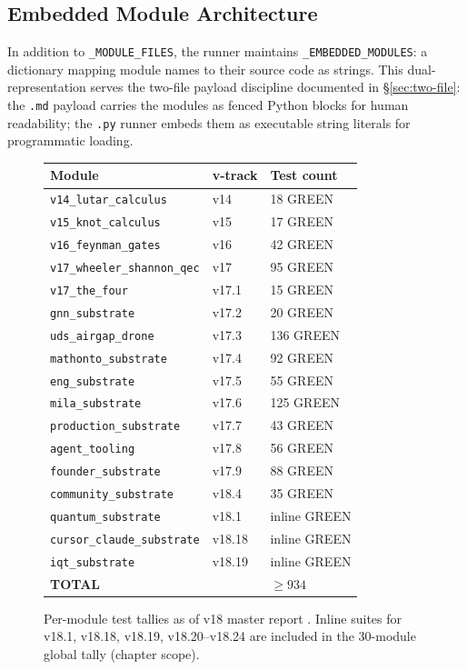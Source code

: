 \subsection{Embedded Module Architecture}
\label{ssec:embedded-arch}

In addition to \texttt{\_MODULE\_FILES}, the runner maintains
\texttt{\_EMBEDDED\_MODULES}: a dictionary mapping module names to their
source code as strings.  This dual-representation serves the two-file payload
discipline documented in \S\ref{sec:two-file}: the \texttt{.md} payload
carries the modules as fenced Python blocks for human readability; the
\texttt{.py} runner embeds them as executable string literals for programmatic
loading.

\begin{figure}[h]
  \centering
  \begin{tabular}{|l|l|l|}
    \hline
    \textbf{Module} & \textbf{v-track} & \textbf{Test count} \\
    \hline
    \texttt{v14\_lutar\_calculus} & v14 & 18 GREEN \\
    \texttt{v15\_knot\_calculus} & v15 & 17 GREEN \\
    \texttt{v16\_feynman\_gates} & v16 & 42 GREEN \\
    \texttt{v17\_wheeler\_shannon\_qec} & v17 & 95 GREEN \\
    \texttt{v17\_the\_four} & v17.1 & 15 GREEN \\
    \texttt{gnn\_substrate} & v17.2 & 20 GREEN \\
    \texttt{uds\_airgap\_drone} & v17.3 & 136 GREEN \\
    \texttt{mathonto\_substrate} & v17.4 & 92 GREEN \\
    \texttt{eng\_substrate} & v17.5 & 55 GREEN \\
    \texttt{mila\_substrate} & v17.6 & 125 GREEN \\
    \texttt{production\_substrate} & v17.7 & 43 GREEN \\
    \texttt{agent\_tooling} & v17.8 & 56 GREEN \\
    \texttt{founder\_substrate} & v17.9 & 88 GREEN \\
    \texttt{community\_substrate} & v18.4 & 35 GREEN \\
    \texttt{quantum\_substrate} & v18.1 & inline GREEN \\
    \texttt{cursor\_claude\_substrate} & v18.18 & inline GREEN \\
    \texttt{iqt\_substrate} & v18.19 & inline GREEN \\
    \hline
    \multicolumn{2}{|l|}{\textbf{TOTAL}} & $\geq 934$ \\
    \hline
  \end{tabular}
  \caption{Per-module test tallies as of v18 master report
    \cite{szl_master_v18}. Inline suites for v18.1, v18.18,
    v18.19, v18.20--v18.24 are included in the 30-module global tally
    (chapter scope).}
  \label{fig:module-tally}
\end{figure}


